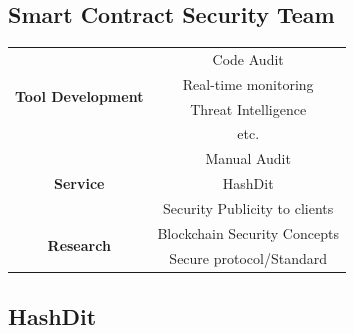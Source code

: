 \documentclass[a0,portrait]{a0poster}
\begin{document}

\begin{multicols}{2} %


\section{Smart Contract Security Team}
\large
\begin{table}[H]
\centering
\begin{tabular}{|c|c|}
\hline
\multirow{4}{*}{\textbf{Tool Development}} & Code Audit                    \\ \cline{2-2} 
                                           & Real-time monitoring          \\ \cline{2-2} 
                                           & Threat Intelligence           \\ \cline{2-2} 
                                           & etc.                          \\ \hline
\multirow{3}{*}{\textbf{Service}}          & Manual Audit                  \\ \cline{2-2} 
                                           & HashDit                       \\ \cline{2-2} 
                                           & Security Publicity to clients \\ \hline
\multirow{2}{*}{\textbf{Research}}         & Blockchain Security Concepts  \\ \cline{2-2} 
                                           & Secure protocol/Standard      \\ \hline
\end{tabular}
\end{table}
\subsection{HashDit}


\end{multicols}
\end{document}
